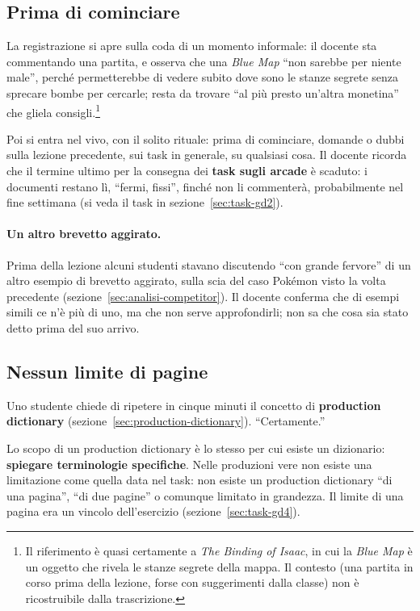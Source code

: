 \subsection{Prima di cominciare}

La registrazione si apre sulla coda di un momento informale: il docente sta
commentando una partita, e osserva che una \emph{Blue Map} ``non sarebbe per
niente male'', perché permetterebbe di vedere subito dove sono le stanze
segrete senza sprecare bombe per cercarle; resta da trovare ``al più
presto un'altra monetina'' che gliela consigli.\footnote{Il riferimento è
quasi certamente a \emph{The Binding of Isaac}, in cui la \emph{Blue Map}
è un oggetto che rivela le stanze segrete della mappa. Il contesto (una
partita in corso prima della lezione, forse con suggerimenti dalla classe)
non è ricostruibile dalla trascrizione.}

Poi si entra nel vivo, con il solito rituale: prima di cominciare, domande o
dubbi sulla lezione precedente, sui task in generale, su qualsiasi cosa. Il
docente ricorda che il termine ultimo per la consegna dei \textbf{task
sugli arcade} è scaduto: i documenti restano lì, ``fermi, fissi'', finché non
li commenterà, probabilmente nel fine settimana (si veda il task in
sezione~\ref{sec:task-gd2}).

\paragraph{Un altro brevetto aggirato.} Prima della lezione alcuni studenti
stavano discutendo ``con grande fervore'' di un altro esempio di brevetto
aggirato, sulla scia del caso Pokémon visto la volta precedente
(sezione~\ref{sec:analisi-competitor}). Il docente conferma che di esempi
simili ce n'è più di uno, ma che non serve approfondirli; non sa che cosa sia
stato detto prima del suo arrivo.

\subsection{Nessun limite di pagine}

Uno studente chiede di ripetere in cinque minuti il concetto di
\textbf{production dictionary} (sezione~\ref{sec:production-dictionary}).
``Certamente.''

Lo scopo di un production dictionary è lo stesso per cui esiste un
dizionario: \textbf{spiegare terminologie specifiche}. Nelle produzioni vere
non esiste una limitazione come quella data nel task: non esiste un
production dictionary ``di una pagina'', ``di due pagine'' o comunque
limitato in grandezza. Il limite di una pagina era un vincolo
dell'esercizio (sezione~\ref{sec:task-gd4}).

